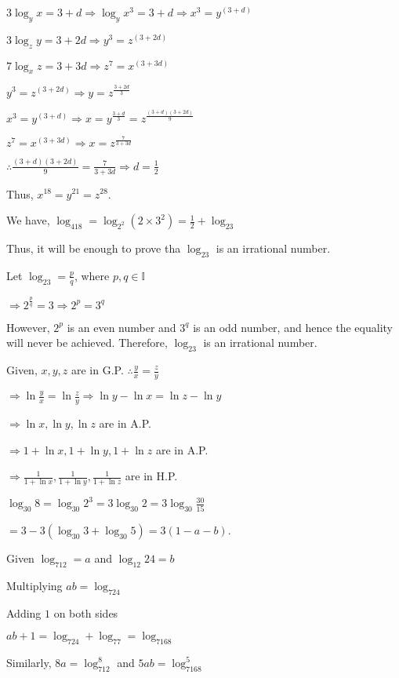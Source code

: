   $3\log_yx = 3 + d \Rightarrow \log_yx^3 = 3 + d \Rightarrow x^3 = y^{(3 +d)}$

  $3\log_zy = 3 + 2d \Rightarrow y^3 = z^{(3 + 2d)}$

  $7\log_xz = 3 + 3d \Rightarrow z^7 = x^{(3 + 3d)}$

  $y^3 = z^{(3 + 2d)}\Rightarrow y = z^{\tfrac{3 + 2d}{3}}$

  $x^3 = y^{(3 + d)}\Rightarrow x = y^{\tfrac{3 + d}{3}} = z^{\tfrac{(3 + d)(3 + 2d)}{9}}$

  $z^7 = x^{(3 + 3d)}\Rightarrow x = z^{\tfrac{7}{3 + 3d}}$

  $\therefore \frac{(3 + d)(3 + 2d)}{9} = \frac{7}{3 + 3d}\Rightarrow d = \frac{1}{2}$

  Thus, $x^{18} = y^{21} = z^{28}$.
\item We have, $\log_418 = \log_{2^2}(2\times3^2) = \frac{1}{2} + \log_23$

  Thus, it will be enough to prove tha $\log_23$ is an irrational number.

  Let $\log_23 = \frac{p}{q}$, where $p, q\in\mathbb{I}$

  $\Rightarrow 2^{\tfrac{p}{q}} = 3 \Rightarrow 2^p = 3^q$

  However, $2^p$ is an even number and $3^q$ is an odd number, and hence the equality will never be achieved.
  Therefore, $\log_23$ is an irrational number.
\item Given, $x, y, z$ are in G.P. $\therefore \frac{y}{x} = \frac{z}{y}$

  $\Rightarrow \ln\frac{y}{x} = \ln\frac{z}{y}\Rightarrow \ln y - \ln x = \ln z - \ln y$

  $\Rightarrow \ln x, \ln y, \ln z$ are in A.P.

  $\Rightarrow 1 + \ln x, 1 + \ln y, 1 + \ln z$ are in A.P.

  $\Rightarrow \frac{1}{1 + \ln x}, \frac{1}{1 + \ln y}, \frac{1}{1 + \ln z}$ are in H.P.
\item $\log_{30}8 = \log_{30}2^3 = 3\log_{30}2 = 3\log_{30}\frac{30}{15}$

  $= 3 - 3(\log_{30}3 + \log_{30}5) = 3(1 - a - b)$.
\item Given $\log_712 = a$ and $\log_{12}24 = b$

  Multiplying $ab = \log_724$

  Adding $1$ on both sides

  $ab + 1 = \log_724 + \log_77 = \log_7168$

  Similarly, $8a = \log_712^8$ and $5ab = \log_7168^5$

